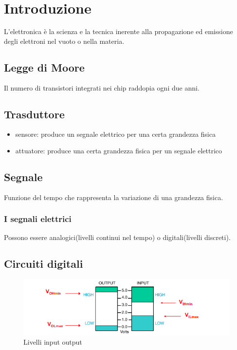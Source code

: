 \section{Introduzione}

L'elettronica è la scienza e la tecnica inerente 
alla propagazione ed emissione degli elettroni nel vuoto o nella materia.

\subsection{Legge di Moore}
Il numero di transistori integrati nei chip raddopia ogni due anni.

\subsection{Trasduttore}
\begin{itemize}
    \item sensore: produce un segnale elettrico per una certa grandezza fisica
    \item attuatore: produce una certa grandezza fisica per un segnale elettrico
\end{itemize}

\subsection{Segnale}
Funzione del tempo che rappresenta la variazione di una grandezza fisica.

\subsubsection{I segnali elettrici}
Possono essere analogici(livelli continui nel tempo) o digitali(livelli discreti).

\subsection{Circuiti digitali}
\begin{figure}[H]
    \centering
    \includegraphics[width=0.5\linewidth]{imgs/0 - livelli-input-output}
    \caption{Livelli input output}
    \label{fig:input_output_livelli}
\end{figure}

